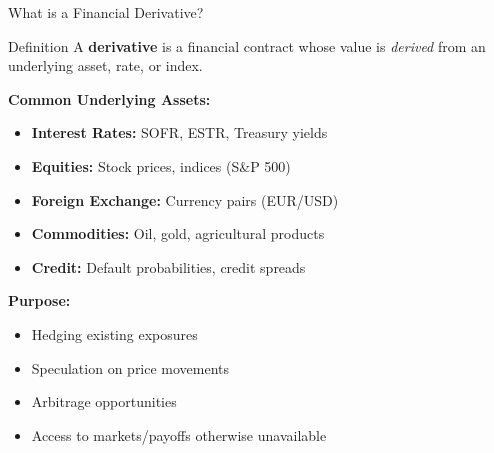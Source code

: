 \documentclass[aspectratio=169,11pt]{beamer}
\begin{document}
\begin{frame}{What is a Financial Derivative?}
\begin{block}{Definition}
A \textbf{derivative} is a financial contract whose value is \emph{derived} from an underlying asset, rate, or index.
\end{block}

\vspace{0.3cm}
\textbf{Common Underlying Assets:}
\begin{itemize}
    \item \textbf{Interest Rates:} SOFR, ESTR, Treasury yields
    \item \textbf{Equities:} Stock prices, indices (S\&P 500)
    \item \textbf{Foreign Exchange:} Currency pairs (EUR/USD)
    \item \textbf{Commodities:} Oil, gold, agricultural products
    \item \textbf{Credit:} Default probabilities, credit spreads
\end{itemize}

\vspace{0.3cm}
\textbf{Purpose:}
\begin{itemize}
    \item Hedging existing exposures
    \item Speculation on price movements
    \item Arbitrage opportunities
    \item Access to markets/payoffs otherwise unavailable
\end{itemize}
\end{frame}
\end{document}
